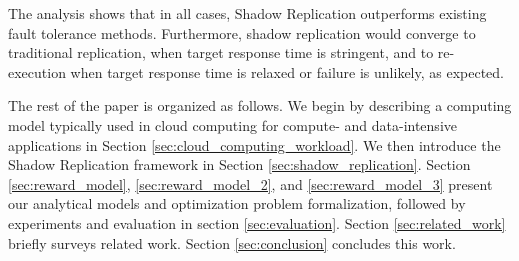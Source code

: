 
The analysis shows that in all cases, Shadow Replication outperforms
existing fault tolerance methods. Furthermore, shadow
replication would converge to traditional replication, when target response time is stringent, and to re-execution when target response time is relaxed or failure is unlikely, as expected.

The rest of the paper is organized as follows. We begin by describing a
computing model typically used in cloud computing for compute- and
data-intensive applications in
Section \ref{sec:cloud_computing_workload}. We then introduce
the Shadow Replication framework in
Section \ref{sec:shadow_replication}. Section
\ref{sec:reward_model},  \ref{sec:reward_model_2}, and \ref{sec:reward_model_3} present our analytical models and optimization
problem formalization, followed by experiments and evaluation in
section \ref{sec:evaluation}. Section \ref{sec:related_work} briefly
surveys related work. Section \ref{sec:conclusion} concludes this work.

